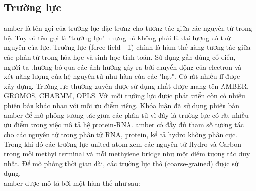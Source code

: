 \documentclass[12pt,a4paper,reqno, oneside]{book}
\begin{document}
	\subsection{Trường lực}
	
		\Gls{amber} là tên gọi của trường lực đặc trưng cho tương tác giữa các nguyên tử trong hệ. Tuy có tên gọi là "trường lực" nhưng nó không phải là đại lượng có thứ nguyên của lực. Trường lực (force field - ff) chính là hàm thế năng tương tác giữa các phân tử trong hóa học và sinh học tính toán. Sử dụng gần đúng cổ điển, người ta thường bỏ qua các ảnh hưởng gây ra bởi chuyển động của electron và xét năng lượng của hệ nguyên tử như hàm của các "hạt". Có rất nhiều ff được xây dựng. Trường lực thường xuyên được sử dụng nhất được mang tên AMBER\cite{Duan2003,Cornell1995,Hornak2006,Ponder2003,Mackerell2004}, GROMOS\cite{Soares2005,Oostenbrink2004,Schmid2011,Schuler2001,Cornell1995}, CHARMM\cite{Mackerell2004,Cornell1995}, OPLS\cite{Mackerell2004,Cornell1995}. Với mỗi trường lực được phát triển còn có nhiều phiên bản khác nhau với mỗi ưu điểm riêng.
		Khóa luận đã sử dụng phiên bản \gls{amber} để mô phỏng tương tác giữa các phân tử vì đây là trường lực có rất nhiều ưu điểm trong việc mô tả hệ protein-RNA\cite{Hornak2006}. \Gls{amber} có đầy đủ tham số tương tác cho các nguyên tử trong phân tử RNA, protein, kể cả hydro không phân cực. Trong khi đó các trường lực united-atom xem các nguyên tử Hydro và Carbon trong mỗi methyl terminal và mỗi methylene bridge như một điểm tương tác duy nhất. Để mô phỏng thời gian dài, các trường lực thô (coarse-grained) được sử dụng.\\
		\Gls{amber} được mô tả bởi một hàm thế như sau:
\end{document}
